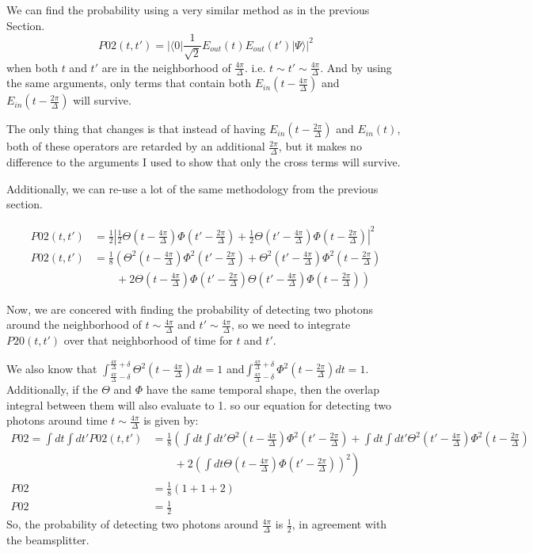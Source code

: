 \documentclass[12pt]{article}
\begin{document}
We can find the probability using a very similar method as in the previous Section. 
\begin{equation}
P02(t,t') = |\langle 0| \frac{1}{\sqrt{2}} E_{out}(t) E_{out}(t')|\Psi\rangle|^2
\end{equation}
when both $t$ and $t'$ are in the neighborhood of $\frac{4 \pi}{\Delta}$. i.e. $t\sim t' \sim \frac{ 4 \pi}{\Delta}$.
And by using the same arguments, only terms that contain both $E_{in}(t-\frac{4 \pi}{\Delta})$ and $E_{in}(t -\frac{2 \pi}{\Delta})$ will survive. 

The only thing that changes is that instead of having $E_{in}(t-\frac{2 \pi}{\Delta})$ and $E_{in}(t)$, both of these operators are retarded by an additional $\frac{2 \pi}{\Delta}$, but it makes
no difference to the arguments I used to show that only the cross terms will survive.

Additionally, we can re-use a lot of the same methodology from the previous section.

\begin{align}
P02(t,t') & =\frac{1}{2}\left| \frac{1}{2}\Theta(t-\frac{4\pi}{\Delta})\Phi(t'-\frac{2 \pi}{\Delta})+\frac{1}{2}\Theta(t'-\frac{4 \pi}{\Delta})\Phi(t-\frac{2 \pi}{\Delta})\right|^2\\
P02(t,t') &= \frac{1}{8} \left(\Theta^2(t-\frac{4\pi}{\Delta})\Phi^2(t'-\frac{2 \pi}{\Delta})+\Theta^2(t'-\frac{4\pi}{\Delta})\Phi^2(t-\frac{2 \pi}{\Delta})\right.\\
&\left. \qquad +2\Theta(t-\frac{4\pi}{\Delta})\Phi(t'-\frac{2 \pi}{\Delta})\Theta(t'-\frac{4\pi}{\Delta})\Phi(t-\frac{2 \pi}{\Delta})\right)
\end{align}

Now, we are concered with finding the probability of detecting two photons around the neighborhood of $t \sim \frac{4 \pi}{\Delta}$ and $t' \sim \frac{4 \pi}{\Delta}$, so we need to integrate $P20(t,t')$ over that neighborhood of time for $t$ and $t'$. 

We also know that $\int^{\frac{4 \pi}{\Delta} +\delta}_{\frac{4 \pi}{\Delta}-\delta} \Theta^2(t-\frac{4\pi}{\Delta} )dt =1$ and$\int^{\frac{4 \pi}{\Delta} +\delta}_{\frac{4 \pi}{\Delta}-\delta} \Phi^2(t-\frac{2\pi}{\Delta}) dt =1$. Additionally, if the $\Theta$ and $\Phi$ have the same temporal shape, then the overlap integral between them will also evaluate to 1. so our equation for detecting two photons around time $t\sim \frac{4 \pi}{\Delta}$ is given by:
\begin{align}
\label{eq:afcp02bs}
P02 = \int dt \int dt' P02(t,t') &= \frac{1}{8} \left (\int dt \int dt'\Theta^2(t-\frac{4\pi}{\Delta})\Phi^2(t'-\frac{2 \pi}{\Delta})+\int dt \int dt'\Theta^2(t'-\frac{4\pi}{\Delta})\Phi^2(t-\frac{2 \pi}{\Delta})\right.\\
&\left. \qquad +2\left (\int dt \Theta(t-\frac{4\pi}{\Delta})\Phi(t'-\frac{2 \pi}{\Delta})\right)^2\right)\\
P02 &= \frac{1}{8}\left( 1 + 1 +2\right)\\
P02 &= \frac{1}{2}
\end{align}
So, the probability of detecting two photons around $\frac{4\pi}{\Delta}$ is $\frac{1}{2}$, in agreement with the beamsplitter.
\end{document}
